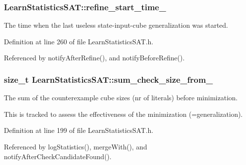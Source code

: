 \hypertarget{classLearnStatisticsSAT_af358ee7d57095acbb602d9b9e1329dd2}{
\subsubsection[{refine\-\_\-start\-\_\-time\-\_\-}]{ Learn\-Statistics\-S\-A\-T\-::refine\-\_\-start\-\_\-time\-\_\-\hspace{0.3cm}{\ttfamily [protected]}}}\label{classLearnStatisticsSAT_af358ee7d57095acbb602d9b9e1329dd2}


The time when the last useless state-\/input-\/cube generalization was started. 



Definition at line 260 of file Learn\-Statistics\-S\-A\-T.\-h.



Referenced by notify\-After\-Refine(), and notify\-Before\-Refine().

\hypertarget{classLearnStatisticsSAT_a2d6735aa7c84c50967b3bb779d2a0a86}{
\subsubsection[{sum\-\_\-check\-\_\-size\-\_\-from\-\_\-}]{\setlength{\rightskip}{0pt plus 5cm}size\-\_\-t Learn\-Statistics\-S\-A\-T\-::sum\-\_\-check\-\_\-size\-\_\-from\-\_\-\hspace{0.3cm}{\ttfamily [protected]}}}\label{classLearnStatisticsSAT_a2d6735aa7c84c50967b3bb779d2a0a86}


The sum of the counterexample cube sizes (nr of literals) before minimization. 

This is tracked to assess the effectiveness of the minimization (=generalization). 

Definition at line 199 of file Learn\-Statistics\-S\-A\-T.\-h.



Referenced by log\-Statistics(), merge\-With(), and notify\-After\-Check\-Candidate\-Found().

